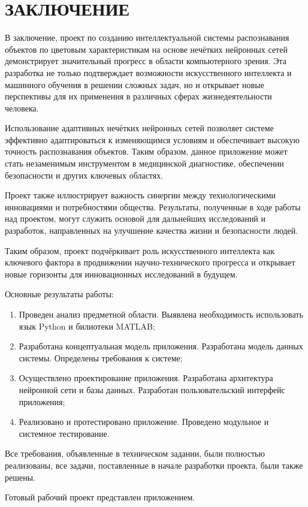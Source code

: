 \section*{ЗАКЛЮЧЕНИЕ}

В заключение, проект по созданию интеллектуальной системы распознавания объектов по цветовым характеристикам на основе нечётких нейронных сетей демонстрирует значительный прогресс в области компьютерного зрения. Эта разработка не только подтверждает возможности искусственного интеллекта и машинного обучения в решении сложных задач, но и открывает новые перспективы для их применения в различных сферах жизнедеятельности человека.

Использование адаптивных нечётких нейронных сетей позволяет системе эффективно адаптироваться к изменяющимся условиям и обеспечивает высокую точность распознавания объектов. Таким образом, данное приложение может стать незаменимым инструментом в медицинской диагностике, обеспечении безопасности и других ключевых областях.

Проект также иллюстрирует важность синергии между технологическими инновациями и потребностями общества. Результаты, полученные в ходе работы над проектом, могут служить основой для дальнейших исследований и разработок, направленных на улучшение качества жизни и безопасности людей.

Таким образом, проект подчёркивает роль искусственного интеллекта как ключевого фактора в продвижении научно-технического прогресса и открывает новые горизонты для инновационных исследований в будущем.

Основные результаты работы:

\begin{enumerate}
\item Проведен анализ предметной области. Выявлена необходимость использовать язык Python и билиотеки MATLAB;
\item Разработана концептуальная модель приложения. Разработана модель данных системы. Определены требования к системе;
\item Осуществлено проектирование приложения. Разработана архитектура нейронной сети и базы данных. Разработан пользовательский интерфейс приложения;
\item Реализовано и протестировано приложение. Проведено модульное и системное тестирование.
\end{enumerate}

Все требования, объявленные в техническом задании, были полностью реализованы, все задачи, поставленные в начале разработки проекта, были также решены.

Готовый рабочий проект представлен приложением. 
